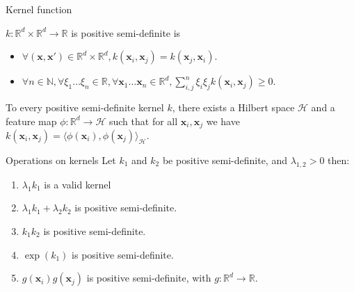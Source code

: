 \begin{frame}{Kernel function}
  \begin{definition}
\(k:\mathbb{R}^d\times\mathbb{R}^d   \to    \mathbb{R}\)   is   positive
semi-definite is
\begin{itemize}
\item \(\forall (\mathbf{x},\mathbf{x}')\in\mathbb{R}^d\times\mathbb{R}^d,
  k(\mathbf{x}_i,\mathbf{x}_j)=k(\mathbf{x}_j,\mathbf{x}_i)\).
\item \(\forall   n\in\mathbb{N},\forall  \xi_1\ldots\xi_n   \in\mathbb{R},
  \forall     \mathbf{x}_1\ldots\mathbf{x}_n      \in     \mathbb{R}^d,
  \sum_{i,j}^n\xi_i\xi_jk(\mathbf{x}_i,\mathbf{x}_j)\geq 0\).
\end{itemize}
\end{definition}

\begin{theorem}
To every  positive semi-definite  kernel \(k\),  there exists  a Hilbert
space        \(\mathcal{H}\)       and        a       feature        map
\(\phi:\mathbb{R}^d\to\mathcal{H}\)      such      that     for      all
\(\mathbf{x}_i,\mathbf{x}_j\)  we  have \(k(\mathbf{x}_i,\mathbf{x}_j)  =
\langle\phi(\mathbf{x}_i),\phi(\mathbf{x}_j)\rangle_\mathcal{H}\).
\end{theorem}

\end{frame}
\begin{frame}[label={sec:orgheadline17}]{Operations on kernels}
Let \(k_1\)  and \(k_2\) be positive  semi-definite, and \(\lambda_{1,2}>0\)
then:
\begin{enumerate}
\item \(\lambda_1k_1\) is a valid kernel
\item \(\lambda_1k_1+\lambda_2k_2\) is positive semi-definite.
\item \(k_1k_2\) is positive semi-definite.
\item \(\exp(k_1)\) is positive semi-definite.
\item \(g(\mathbf{x}_i)g(\mathbf{x}_j)\)  is  positive  semi-definite,  with
\(g:\mathbb{R}^d\to\mathbb{R}\).
\end{enumerate}
\end{frame}

